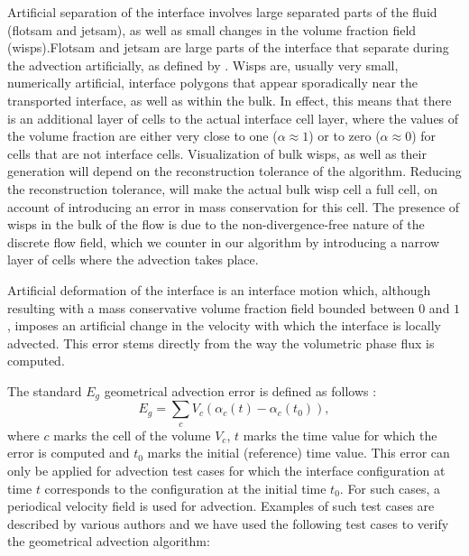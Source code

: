 \begin{description}
 \item Artificial separation of the interface involves large separated parts of the
fluid (flotsam and jetsam), as well as small changes in the volume fraction
field (wisps).Flotsam and jetsam are large parts of the interface that separate
during the advection artificially, as defined by \citet{NohWoodwardSLIC1976}.
Wisps are, usually very small, numerically artificial, interface polygons that
appear sporadically near the transported interface, as well as within the bulk.
In effect, this means that there is an additional layer of cells to the actual
interface cell layer, where the values of the volume fraction are either very
close to one ($\alpha \approx 1$) or to zero ($\alpha \approx 0$) for cells
that are not interface cells. Visualization of bulk wisps, as well as their
generation will depend on the reconstruction tolerance of the algorithm.
Reducing the reconstruction tolerance, will make the actual bulk wisp cell a
full cell, on account of introducing an error in mass conservation for this
cell. The presence of wisps in the bulk of the flow is due to the
non-divergence-free nature of the discrete flow field, which we counter in our
algorithm by introducing a narrow layer of cells where the advection takes
place. 

\item Artificial deformation of the interface is an interface motion which, although
resulting with a mass conservative volume fraction field bounded between $0$
and $1$, imposes an artificial change in the velocity with which the interface
is locally advected.  This error stems directly from the way the volumetric
phase flux is computed. 
\end{description}

The standard $E_g$ geometrical advection error is defined as follows
\citep{Aulisa2007}:
%
\begin{equation}
        E_g = \sum_c V_c (\alpha_c(t) - \alpha_c(t_0)),
        \label{eq:error:geom}
\end{equation}
%
where $c$ marks the cell of the volume $V_c$, $t$ marks the time value for
which the error is computed and $t_0$ marks the initial (reference) time value.
This error can only be applied for advection test cases for which the interface
configuration at time $t$ corresponds to the configuration at the initial time
$t_0$. For such cases, a periodical velocity field is used for advection.
Examples of such test cases are described by various authors and we have
used the following test cases to verify the geometrical advection algorithm:

